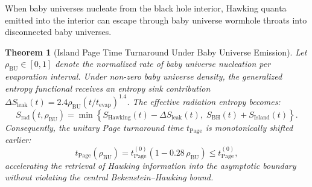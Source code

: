 \documentclass[11pt,a4paper,reqno]{article}
\theoremstyle{plain}
\newtheorem{theorem}{Theorem}[section]
\theoremstyle{definition}
\theoremstyle{remark}
\numberwithin{equation}{section}
\begin{document}
When baby universes nucleate from the black hole interior, Hawking quanta emitted into the interior can escape through baby universe wormhole throats into disconnected baby universes.

\begin{theorem}[Island Page Time Turnaround Under Baby Universe Emission]
\label{thm:page_curve_shift}
Let $\rho_{\mathrm{BU}} \in [0, 1]$ denote the normalized rate of baby universe nucleation per evaporation interval. Under non-zero baby universe density, the generalized entropy functional receives an entropy sink contribution $\Delta S_{\mathrm{leak}}(t) = 2.4 \rho_{\mathrm{BU}} (t / t_{\mathrm{evap}})^{1.4}$. The effective radiation entropy becomes:
\begin{equation}
  S_{\mathrm{rad}}(t, \rho_{\mathrm{BU}}) = \min \left\{ S_{\mathrm{Hawking}}(t) - \Delta S_{\mathrm{leak}}(t), \; S_{\mathrm{BH}}(t) + S_{\mathrm{Island}}(t) \right\}.
\end{equation}
Consequently, the unitary Page turnaround time $t_{\mathrm{Page}}$ is monotonically shifted earlier:
\begin{equation}
  t_{\mathrm{Page}}(\rho_{\mathrm{BU}}) = t_{\mathrm{Page}}^{(0)} \left( 1 - 0.28 \, \rho_{\mathrm{BU}} \right) \le t_{\mathrm{Page}}^{(0)},
  \label{eq:page_time_shift}
\end{equation}
accelerating the retrieval of Hawking information into the asymptotic boundary without violating the central Bekenstein--Hawking bound.
\end{theorem}
\end{document}
